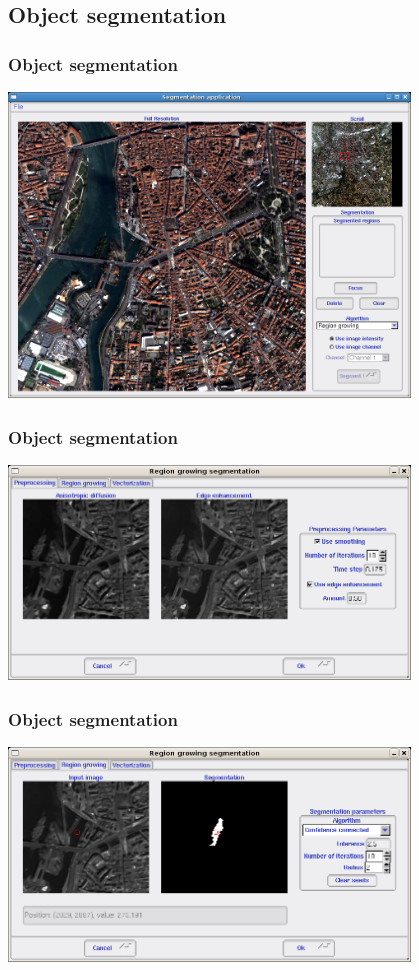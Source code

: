 \documentclass[compress]{beamer}
\begin{document}
\subsection{Object segmentation}

\begin{frame}
  \frametitle{Object segmentation}
      \begin{center}
      \includegraphics[width=0.80\textwidth]{Images/seg1.png}
  \end{center}
\end{frame}

\begin{frame}
  \frametitle{Object segmentation}
      \begin{center}
      \includegraphics[width=0.80\textwidth]{Images/seg2.png}
  \end{center}
\end{frame}

\begin{frame}
  \frametitle{Object segmentation}
      \begin{center}
      \includegraphics[width=0.80\textwidth]{Images/seg3.png}
  \end{center}
\end{frame}
\end{document}
